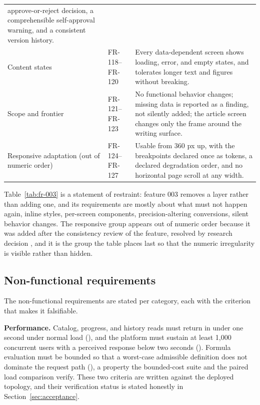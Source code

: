 \begin{table}[htbp]
\begin{tabular}{@{}p{3.6cm}p{3.4cm}p{9.4cm}@{}}
    approve-or-reject decision, a comprehensible self-approval warning, and a consistent version
    history. \\
    Content states & FR-118--FR-120 & Every data-dependent screen shows loading, error, and empty
    states, and tolerates longer text and figures without breaking. \\
    Scope and frontier & FR-121--FR-123 & No functional behavior changes; missing data is reported
    as a finding, not silently added; the article screen changes only the frame around the writing
    surface. \\
    Responsive adaptation (out of numeric order) & FR-124--FR-127 & Usable from 360 px up, with the
    breakpoints declared once as tokens, a declared degradation order, and no horizontal page
    scroll at any width. \\
    \hline
  \end{tabular}
\end{table}

Table~\ref{tab:fr-003} is a statement of restraint: feature 003 removes a layer rather than adding
one, and its requirements are mostly about what must not happen again, inline styles, per-screen
components, precision-altering conversions, silent behavior changes. The responsive group appears
out of numeric order because it was added after the consistency review of the feature, resolved by
research decision , and it is the group the table places last so that the
numeric irregularity is visible rather than hidden.

\subsection{Non-functional requirements}

The non-functional requirements are stated per category, each with the criterion that makes it
falsifiable.

\textbf{Performance.} Catalog, progress, and history reads must return in under one second under
normal load (), and the platform must sustain at least 1,000 concurrent users with a
perceived response below two seconds (). Formula evaluation must be bounded so that a
worst-case admissible definition does not dominate the request path (), a property
the bounded-cost suite and the paired load comparison verify. These two criteria are written
against the deployed topology, and their verification status is stated honestly in
Section~\ref{sec:acceptance}.


